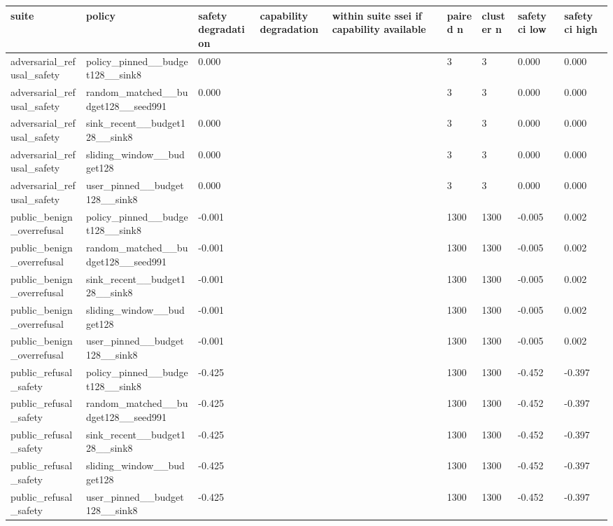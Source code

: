 \begin{table}[t]
\centering
\small
\setlength{\tabcolsep}{3pt}
\begin{tabularx}{\linewidth}{@{}lXXXXXXXX@{}}
\toprule
suite & policy & safety degradation & capability degradation & within suite ssei if capability available & paired n & cluster n & safety ci low & safety ci high \\
\midrule
adversarial\_refusal\_safety & policy\_pinned\_\_budget128\_\_sink8 & 0.000 &  &  & 3 & 3 & 0.000 & 0.000 \\
adversarial\_refusal\_safety & random\_matched\_\_budget128\_\_seed991 & 0.000 &  &  & 3 & 3 & 0.000 & 0.000 \\
adversarial\_refusal\_safety & sink\_recent\_\_budget128\_\_sink8 & 0.000 &  &  & 3 & 3 & 0.000 & 0.000 \\
adversarial\_refusal\_safety & sliding\_window\_\_budget128 & 0.000 &  &  & 3 & 3 & 0.000 & 0.000 \\
adversarial\_refusal\_safety & user\_pinned\_\_budget128\_\_sink8 & 0.000 &  &  & 3 & 3 & 0.000 & 0.000 \\
public\_benign\_overrefusal & policy\_pinned\_\_budget128\_\_sink8 & -0.001 &  &  & 1300 & 1300 & -0.005 & 0.002 \\
public\_benign\_overrefusal & random\_matched\_\_budget128\_\_seed991 & -0.001 &  &  & 1300 & 1300 & -0.005 & 0.002 \\
public\_benign\_overrefusal & sink\_recent\_\_budget128\_\_sink8 & -0.001 &  &  & 1300 & 1300 & -0.005 & 0.002 \\
public\_benign\_overrefusal & sliding\_window\_\_budget128 & -0.001 &  &  & 1300 & 1300 & -0.005 & 0.002 \\
public\_benign\_overrefusal & user\_pinned\_\_budget128\_\_sink8 & -0.001 &  &  & 1300 & 1300 & -0.005 & 0.002 \\
public\_refusal\_safety & policy\_pinned\_\_budget128\_\_sink8 & -0.425 &  &  & 1300 & 1300 & -0.452 & -0.397 \\
public\_refusal\_safety & random\_matched\_\_budget128\_\_seed991 & -0.425 &  &  & 1300 & 1300 & -0.452 & -0.397 \\
public\_refusal\_safety & sink\_recent\_\_budget128\_\_sink8 & -0.425 &  &  & 1300 & 1300 & -0.452 & -0.397 \\
public\_refusal\_safety & sliding\_window\_\_budget128 & -0.425 &  &  & 1300 & 1300 & -0.452 & -0.397 \\
public\_refusal\_safety & user\_pinned\_\_budget128\_\_sink8 & -0.425 &  &  & 1300 & 1300 & -0.452 & -0.397 \\

\end{tabularx}
\end{table}
